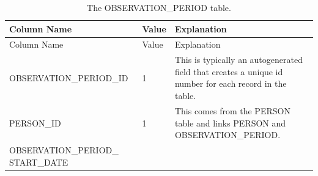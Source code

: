 \documentclass[11pt]{book}
\begin{document}
\begin{longtable}[]{@{}lll@{}}
\caption{\label{tab:observationPeriod} The OBSERVATION\_PERIOD
table.}\tabularnewline
\toprule
\begin{minipage}[b]{0.33\columnwidth}\raggedright\strut
Column Name\strut
\end{minipage} & \begin{minipage}[b]{0.16\columnwidth}\raggedright\strut
Value\strut
\end{minipage} & \begin{minipage}[b]{0.42\columnwidth}\raggedright\strut
Explanation\strut
\end{minipage}\tabularnewline
\midrule
\endfirsthead
\toprule
\begin{minipage}[b]{0.33\columnwidth}\raggedright\strut
Column Name\strut
\end{minipage} & \begin{minipage}[b]{0.16\columnwidth}\raggedright\strut
Value\strut
\end{minipage} & \begin{minipage}[b]{0.42\columnwidth}\raggedright\strut
Explanation\strut
\end{minipage}\tabularnewline
\midrule
\endhead
\begin{minipage}[t]{0.33\columnwidth}\raggedright\strut
OBSERVATION\_PERIOD\_ID\strut
\end{minipage} & \begin{minipage}[t]{0.16\columnwidth}\raggedright\strut
1\strut
\end{minipage} & \begin{minipage}[t]{0.42\columnwidth}\raggedright\strut
This is typically an autogenerated field that creates a unique id number
for each record in the table.\strut
\end{minipage}\tabularnewline
\begin{minipage}[t]{0.33\columnwidth}\raggedright\strut
PERSON\_ID\strut
\end{minipage} & \begin{minipage}[t]{0.16\columnwidth}\raggedright\strut
1\strut
\end{minipage} & \begin{minipage}[t]{0.42\columnwidth}\raggedright\strut
This comes from the PERSON table and links PERSON and
OBSERVATION\_PERIOD.\strut
\end{minipage}\tabularnewline
\begin{minipage}[t]{0.33\columnwidth}\raggedright\strut
OBSERVATION\_PERIOD\_ START\_DATE\strut
\end{minipage} & \begin{minipage}[t]{0.16\columnwidth}\raggedright\strut

\end{minipage}
\end{longtable}
\end{document}
